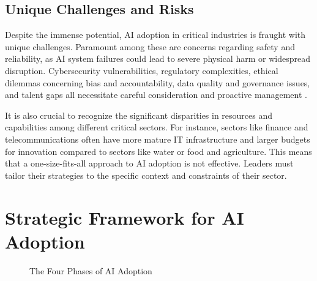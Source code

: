 \subsection{Unique Challenges and Risks}

Despite the immense potential, AI adoption in critical industries is fraught with unique challenges. Paramount among these are concerns regarding safety and reliability, as AI system failures could lead to severe physical harm or widespread disruption. Cybersecurity vulnerabilities, regulatory complexities, ethical dilemmas concerning bias and accountability, data quality and governance issues, and talent gaps all necessitate careful consideration and proactive management \parencite{dhs2024roles}.

It is also crucial to recognize the significant disparities in resources and capabilities among different critical sectors. For instance, sectors like finance and telecommunications often have more mature IT infrastructure and larger budgets for innovation compared to sectors like water or food and agriculture. This means that a one-size-fits-all approach to AI adoption is not effective. Leaders must tailor their strategies to the specific context and constraints of their sector.

\section{Strategic Framework for AI Adoption}

\begin{figure}[h]
\centering
{}
\caption{The Four Phases of AI Adoption}
\label{fig:adoption_flowchart}
\end{figure}

